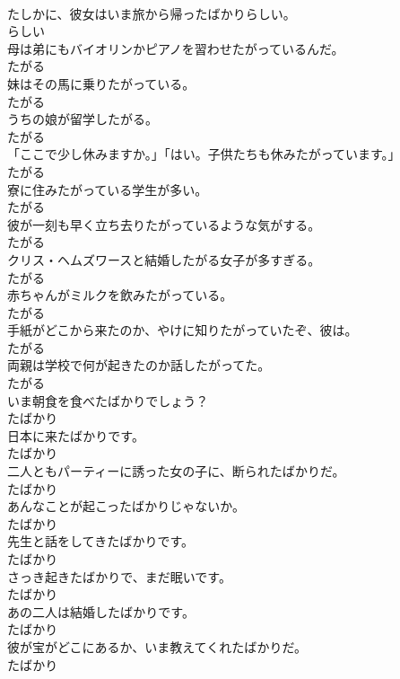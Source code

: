 \documentclass[8pt]{extreport}
\begin{document}
\begin{CJK}{UTF8}{min}
\\	たしかに、彼女はいま旅から帰ったばかりらしい。	
\\	らしい	
\\	母は弟にもバイオリンかピアノを習わせたがっているんだ。	
\\	たがる	
\\	妹はその馬に乗りたがっている。	
\\	たがる	
\\	うちの娘が留学したがる。	
\\	たがる	
\\	「ここで少し休みますか。」「はい。子供たちも休みたがっています。」	
\\	たがる	
\\	寮に住みたがっている学生が多い。	
\\	たがる	
\\	彼が一刻も早く立ち去りたがっているような気がする。	
\\	たがる	
\\	クリス・ヘムズワースと結婚したがる女子が多すぎる。	
\\	たがる	
\\	赤ちゃんがミルクを飲みたがっている。	
\\	たがる	
\\	手紙がどこから来たのか、やけに知りたがっていたぞ、彼は。	
\\	たがる	
\\	両親は学校で何が起きたのか話したがってた。	
\\	たがる	
\\	いま朝食を食べたばかりでしょう？	
\\	たばかり	
\\	日本に来たばかりです。	
\\	たばかり	
\\	二人ともパーティーに誘った女の子に、断られたばかりだ。	
\\	たばかり	
\\	あんなことが起こったばかりじゃないか。	
\\	たばかり	
\\	先生と話をしてきたばかりです。	
\\	たばかり	
\\	さっき起きたばかりで、まだ眠いです。	
\\	たばかり	
\\	あの二人は結婚したばかりです。	
\\	たばかり	
\\	彼が宝がどこにあるか、いま教えてくれたばかりだ。	
\\	たばかり	

\end{CJK}
\end{document}
